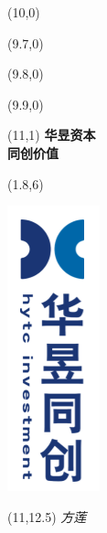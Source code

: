 \begin{titlepage}

\setlength\parindent{0pt}


\begin{textblock}{6}(10,0)
    \rule{0mm}{420mm}
\end{textblock}

\begin{textblock}{.02}(9.7,0)
    \rule{0mm}{420mm}
\end{textblock}

\begin{textblock}{.02}(9.8,0)
    \rule{0mm}{420mm}
\end{textblock}

\begin{textblock}{.02}(9.9,0)
    \rule{0mm}{420mm}
\end{textblock}

\begin{textblock}{3}(11,1)
    {\Huge \textbf{华昱资本}\\[5pt] \textbf{\hspace{2cm}同创价值}}
\end{textblock}

\begin{textblock}{12}(1.8,6)
\textblockcolour{}
\begin{center}
    \includegraphics[scale=1.2]{../../imgs/hytc.png}
\end{center}
\end{textblock}

\begin{textblock}{4}(11,12.5)
    \vspace{2cm}
    {\huge \textit{方莲}}\\[5pt]
    {\Large \lnotesdate}
\end{textblock}


\end{titlepage}
